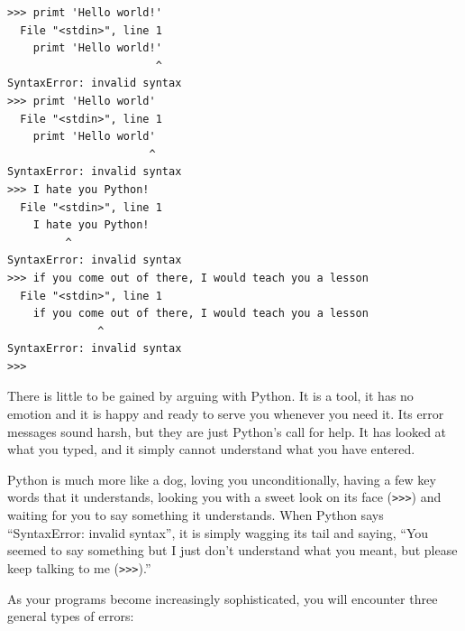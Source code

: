 \beforeverb
\begin{verbatim}
>>> primt 'Hello world!'
  File "<stdin>", line 1
    primt 'Hello world!'
                       ^
SyntaxError: invalid syntax
>>> primt 'Hello world'
  File "<stdin>", line 1
    primt 'Hello world'
                      ^
SyntaxError: invalid syntax
>>> I hate you Python!
  File "<stdin>", line 1
    I hate you Python!
         ^
SyntaxError: invalid syntax
>>> if you come out of there, I would teach you a lesson
  File "<stdin>", line 1
    if you come out of there, I would teach you a lesson
              ^
SyntaxError: invalid syntax
>>> 
\end{verbatim}
\afterverb
%
There is little to be gained by arguing with Python.  It is a tool,
it has no emotion and it is happy and ready to serve you whenever you
need it.  Its error messages sound harsh, but they are just Python's
call for help.  It has looked at what you typed, and it simply cannot
understand what you have entered.

Python is much more like a dog, loving you unconditionally, having a few
key words that it understands, looking you with a sweet look on its
face ({\tt >>>}) and waiting for you to say something it understands.
When Python says ``SyntaxError: invalid syntax'', it is simply wagging
its tail and saying, ``You seemed to say something but I just don't
understand what you meant, but please keep talking to me ({\tt >>>}).''

As your programs become increasingly sophisticated, you will encounter three 
general types of errors:

